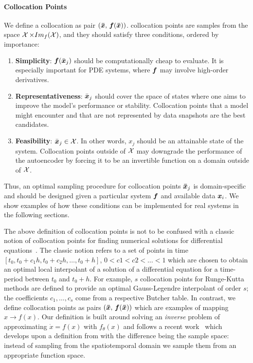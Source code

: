 \paragraph{Collocation Points}
\label{sec:collocations_conditions} We define a collocation as pair $(\boldsymbol{\bar{x}},\, \boldsymbol{f}(\boldsymbol{\bar{x}}))$. collocation points are samples from the space $\operatorname{\mathcal{X}} \times Im_{f}(\operatorname{\mathcal{X}})$, and they should satisfy three conditions, ordered by importance:
\begin{enumerate}
    \item \textbf{Simplicity}: $\boldsymbol{f}(\bar{\boldsymbol{x}}_j)$ should be computationally cheap to evaluate. It is especially important for PDE systems, where $\boldsymbol{f}$ may involve high-order derivatives.
    \item \textbf{Representativeness}: $\bar{\boldsymbol{x}}_j$ should cover the space of states where one aims to improve the model's performance or stability. Collocation points that a model might encounter and that are not represented by data snapshots are the best candidates.
    \item \textbf{Feasibility}: $\bar{\boldsymbol{x}}_j \in \operatorname{\mathcal{X}}$. In other words, $x_j$ should be an attainable state of the system. Collocation points outside of $\operatorname{\mathcal{X}}$ may downgrade the performance of the autoencoder by forcing it to be an invertible function on a domain outside of $\operatorname{\mathcal{X}}$.
\end{enumerate}
Thus, an optimal sampling procedure for collocation points $\boldsymbol{\bar{x}}_j$ is domain-specific and should be designed given a particular system $\boldsymbol{f}$ and available data $\boldsymbol{x}_i$. We show examples of how these conditions can be implemented for real systems in the following sections.

The above definition of collocation points is not to be confused with a classic notion of collocation points for finding numerical solutions for differential equations~\cite{fornberg1998practical, trefethen2022numerical}. The classic notion refers to a set of points in time $[t_0, t_0 + c_1h, t_0 + c_2h, \dots, t_0 + h]$, $0 < c1 < c2 < \dots < 1$ which are chosen to obtain an optimal local interpolant of a solution of a differential equation for a time-period between $t_0$ and $t_0 + h$. For example, $s$ collocation points for Runge-Kutta methods are defined to provide an optimal Gauss-Legendre interpolant of order $s$; the coefficients $c_1, \dots, c_s$ come from a respective Butcher table. In contrast, we define collocation points as pairs $(\boldsymbol{\bar{x}},\, \boldsymbol{f}(\boldsymbol{\bar{x}}))$ which are  examples of mapping $x \to f(x)$. Our definition is built around solving an \textit{inverse} problem of approximating $\dot{x} = f(x)$ with $f_\theta(x)$ and follows a recent work~\cite{liu2022physics} which develops upon a definition from \cite{raissi2018hidden} with the difference being the sample space: instead of sampling from the spatiotemporal domain we sample them from an appropriate function space.

